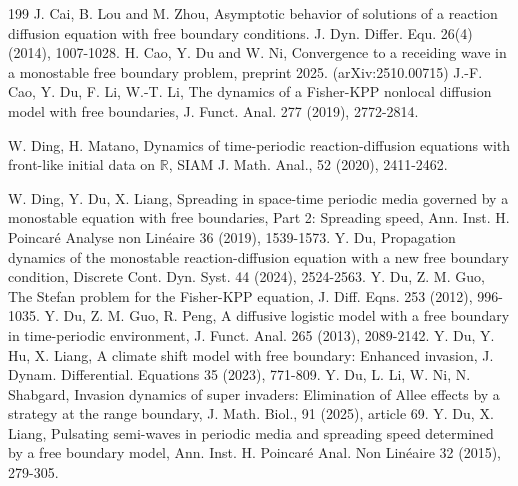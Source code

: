 \documentclass[11pt]{amsart}
\numberwithin{equation}{section}
\begin{document}
\begin{thebibliography}{199}
 J. Cai, B. Lou and M. Zhou, Asymptotic behavior of solutions of a reaction diffusion equation with free boundary conditions. J. Dyn. Differ. Equ. 26(4) (2014), 1007-1028.
 H. Cao, Y. Du and W. Ni, Convergence to a receiding wave in a monostable free boundary problem, preprint 2025. (arXiv:2510.00715)
J.-F. Cao, Y. Du, F. Li, W.-T. Li, The dynamics of a Fisher-KPP nonlocal diffusion model with free boundaries, J. Funct. Anal. 277 (2019), 2772-2814.
 

 W. Ding, H. Matano, Dynamics of time-periodic reaction-diffusion equations with front-like initial data on $\mathbb{R}$, SIAM J. Math. Anal., 52 (2020), 2411-2462.

 W. Ding, Y. Du, X. Liang, Spreading in space-time periodic media governed by a monostable equation with free boundaries, Part 2: Spreading speed, Ann. Inst. H. Poincar\'{e} Analyse non Lin\'{e}aire 36 (2019), 1539-1573. 
 Y. Du, Propagation dynamics of the monostable reaction-diffusion equation with a new free boundary condition, Discrete Cont. Dyn. Syst.  44 (2024),  2524-2563.
 Y. Du, Z. M. Guo, The Stefan problem for the Fisher-KPP equation, J. Diff. Eqns. 253 (2012), 996-1035.
Y. Du, Z. M. Guo, R. Peng, A diffusive logistic model with a free boundary in time-periodic environment, J. Funct. Anal. 265 (2013), 2089-2142.
Y. Du, Y. Hu, X. Liang, A climate shift model with free boundary: Enhanced invasion, J. Dynam. Differential. Equations  35 (2023), 771-809.
 Y. Du, L. Li, W. Ni, N. Shabgard, Invasion dynamics of super invaders: Elimination of Allee effects by a strategy at the range boundary, J. Math. Biol., 91 (2025), article 69.
 Y. Du, X. Liang, Pulsating semi-waves in periodic media and spreading speed determined by a free boundary
  model, Ann. Inst. H. Poincar\'{e} Anal. Non Lin\'{e}aire 32 (2015), 279-305.





\end{thebibliography}
\end{document}
